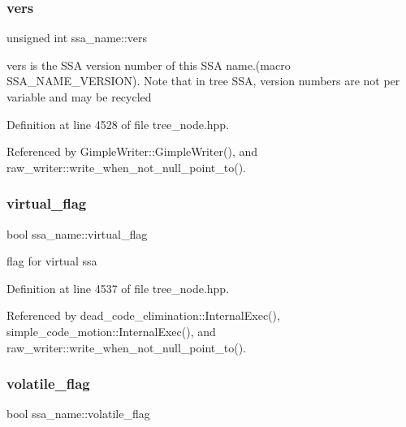 \mbox{\label{structssa__name_a93fb1ab48189c4da88ebe11db35bcca0}} 
\subsubsection{\texorpdfstring{vers}{vers}}
{\footnotesize\ttfamily unsigned int ssa\+\_\+name\+::vers}



vers is the S\+SA version number of this S\+SA name.(macro S\+S\+A\+\_\+\+N\+A\+M\+E\+\_\+\+V\+E\+R\+S\+I\+ON). Note that in tree S\+SA, version numbers are not per variable and may be recycled 



Definition at line 4528 of file tree\+\_\+node.\+hpp.



Referenced by Gimple\+Writer\+::\+Gimple\+Writer(), and raw\+\_\+writer\+::write\+\_\+when\+\_\+not\+\_\+null\+\_\+point\+\_\+to().

\mbox{\label{structssa__name_a611055d0551fb675824a7602906567f3}} 
\subsubsection{\texorpdfstring{virtual\+\_\+flag}{virtual\_flag}}
{\footnotesize\ttfamily bool ssa\+\_\+name\+::virtual\+\_\+flag}



flag for virtual ssa 



Definition at line 4537 of file tree\+\_\+node.\+hpp.



Referenced by dead\+\_\+code\+\_\+elimination\+::\+Internal\+Exec(), simple\+\_\+code\+\_\+motion\+::\+Internal\+Exec(), and raw\+\_\+writer\+::write\+\_\+when\+\_\+not\+\_\+null\+\_\+point\+\_\+to().

\mbox{\label{structssa__name_aa0898d91cc7af0af67605f26f0690a64}} 
\subsubsection{\texorpdfstring{volatile\+\_\+flag}{volatile\_flag}}
{\footnotesize\ttfamily bool ssa\+\_\+name\+::volatile\+\_\+flag}



